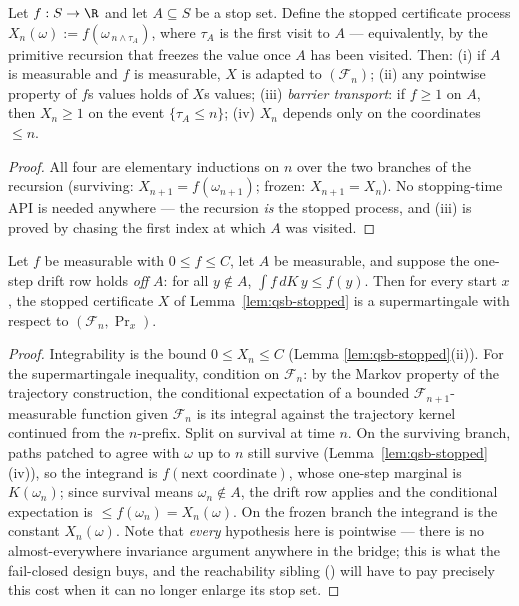 \begin{blemma}\label{lem:qsb-stopped}
Let $f : S \to \R$ and let $A \subseteq S$ be a stop set. Define the
stopped certificate process $X_n(\omega) := f(\omega_{\,n \wedge \tau_A})$,
where $\tau_A$ is the first visit to $A$ --- equivalently, by the
primitive recursion that freezes the value once $A$ has been visited.
Then: (i) if $A$ is measurable and $f$ is measurable, $X$ is adapted to
$(\mathcal{F}_n)$; (ii) any pointwise property of $f$\textquotesingle s
values holds of $X$\textquotesingle s values; (iii) \emph{barrier
transport}: if $f \ge 1$ on $A$, then $X_n \ge 1$ on the event
$\{\tau_A \le n\}$; (iv) $X_n$ depends only on the coordinates $\le n$.
\end{blemma}
\begin{proof}
All four are elementary inductions on $n$ over the two branches of the
recursion (surviving: $X_{n+1} = f(\omega_{n+1})$; frozen:
$X_{n+1} = X_n$). No stopping-time API is needed anywhere --- the
recursion \emph{is} the stopped process, and (iii) is proved by chasing
the first index at which $A$ was visited.
\end{proof}

\begin{blemma}\label{lem:qsb-bridge}
Let $f$ be measurable with $0 \le f \le C$, let $A$ be measurable, and
suppose the one-step drift row holds \emph{off} $A$: for all
$y \notin A$, $\int f\,dK\,y \le f(y)$. Then for every start $x$, the
stopped certificate $X$ of Lemma~\ref{lem:qsb-stopped} is a
supermartingale with respect to $(\mathcal{F}_n, \Pr_x)$.
\end{blemma}
\begin{proof}
Integrability is the bound $0 \le X_n \le C$ (Lemma
\ref{lem:qsb-stopped}(ii)). For the supermartingale inequality,
condition on $\mathcal{F}_n$: by the Markov property of the trajectory
construction, the conditional expectation of a bounded
$\mathcal{F}_{n+1}$-measurable function given $\mathcal{F}_n$ is its
integral against the trajectory kernel continued from the $n$-prefix.
Split on survival at time $n$. On the surviving branch, paths patched to
agree with $\omega$ up to $n$ still survive
(Lemma~\ref{lem:qsb-stopped}(iv)), so the integrand is
$f(\text{next coordinate})$, whose one-step marginal is $K(\omega_n)$;
since survival means $\omega_n \notin A$, the drift row applies and the
conditional expectation is $\le f(\omega_n) = X_n(\omega)$. On the
frozen branch the integrand is the constant $X_n(\omega)$. Note that
\emph{every} hypothesis here is pointwise --- there is no
almost-everywhere invariance argument anywhere in the bridge; this is
what the fail-closed design buys, and the reachability sibling
() will have to pay precisely this cost when
it can no longer enlarge its stop set.
\end{proof}

